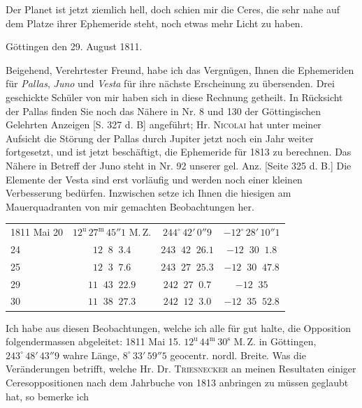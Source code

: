 \par\indent Der Planet ist jetzt ziemlich hell, doch schien mir die Ceres, die sehr nahe auf dem Platze ihrer Ephemeride steht, noch etwas mehr Licht zu haben.
\begin{flushright}Göttingen den 29. August 1811.\end{flushright}
\par\indent Beigehend, Verehrtester Freund, habe ich das Vergnügen, Ihnen die Ephemeriden für \emph{Pallas}, \emph{Juno} und \emph{Vesta} für ihre nächste Erscheinung zu übersenden. Drei geschickte Schüler von mir haben sich in diese Rechnung getheilt. In Rücksicht der Pallas finden Sie noch das Nähere in Nr. 8 und 130 der Göttingischen Gelehrten Anzeigen [S. 327 d. B] angeführt; Hr. \textsc{Nicolai} hat unter meiner Aufsicht die Störung der Pallas durch Jupiter jetzt noch ein Jahr weiter fortgesetzt, und ist jetzt beschäftigt, die Ephemeride für 1813 zu berechnen. Das Nähere in Betreff der Juno steht in Nr. 92 unserer gel. Anz. [Seite 325 d. B.] Die Elemente der Vesta sind erst vorläufig und werden noch einer kleinen Verbesserung bedürfen. Inzwischen setze ich Ihnen die hiesigen am Mauerquadranten von mir gemachten Beobachtungen her.
\begin{center}\fontsize{10}{12}\selectfont\setlength{\tabcolsep}{4pt}\renewcommand{\arraystretch}{1.15}
\begin{tabular}{l|c|c|c}
1811 Mai 20 & $12^{\mathrm u}\,27^{\mathrm m}\,45''1$ M.\,Z. & $244^\circ\,42'\,0''9$ & $-12^\circ\,28'\,10''1$ \\
\phantom{1811 Mai }24 & $12\;\;8\;\;3.4$ & $243\;\;42\;\;26.1$ & $-12\;\;30\;\;1.8$ \\
\phantom{1811 Mai }25 & $12\;\;3\;\;7.6$ & $243\;\;27\;\;25.3$ & $-12\;\;30\;\;47.8$ \\
\phantom{1811 Mai }29 & $11\;\;43\;\;22.9$ & $242\;\;27\;\;0.7$ & $-12\;\;35$ \\
\phantom{1811 Mai }30 & $11\;\;38\;\;27.3$ & $242\;\;12\;\;3.0$ & $-12\;\;35\;\;52.8$ \\
\end{tabular}
\end{center}


\par\indent Ich habe aus diesen Beobachtungen, welche ich alle für gut halte, die Opposition folgendermassen abgeleitet: 1811 Mai 15. $12^{\mathrm u}\,44^{\mathrm m}\,30^{\mathrm s}$ M.\,Z. in Göttingen, $243^\circ\,48'\,43''9$ wahre Länge, $8^\circ\,33'\,59''5$ geocentr. nordl. Breite. Was die Veränderungen betrifft, welche Hr. Dr. \textsc{Triesnecker} an meinen Resultaten einiger Ceresoppositionen nach dem Jahrbuche von 1813 anbringen zu müssen geglaubt hat, so bemerke ich

